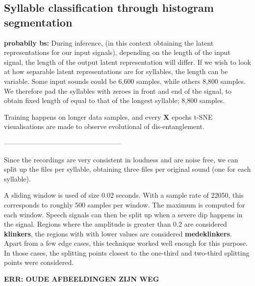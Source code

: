 \begin{appendices}
	\chapter{Syllable classification through histogram segmentation} \label{appendix:split_syllables}
	
	
	\textbf{probabily bs:}
	During inference, (in this context obtaining the latent representations for our input signals), depending on the length of the input signal, the length of the output latent representation will differ.
	If we wish to look at how separable latent representations are for syllables, the length can be variable. Some input sounds could be 6,600 samples, while others 8,800 samples. We therefore pad the syllables with zeroes in front and end of the signal, to obtain fixed length of equal to that of the longest syllable; 8,800 samples.
	
	Training happens on longer data samples, and every \textbf{X} epochs t-SNE visualisations are made to observe evolutional of dis-entanglement.
	
	
	
	
	
	---------------------------------------------------
	
	
	
	
	Since the recordings are very consistent in loudness and are noise free, we can split up the files per syllable, obtaining three files per original sound (one for each syllable).
	
	A sliding window is used of size 0.02 seconds. With a sample rate of 22050, this corresponds to roughly 500 samples per window. The maximum is computed for each window. Speech signals can then be split up when a severe dip happens in the signal. Regions where the amplitude is greater than 0.2 are considered \textbf{klinkers}, the regions with with lower values are considered \textbf{medeklinkers}. Apart from a few edge cases, this technique worked well enough for this purpose. In those cases, the splitting points closest to the one-third and two-third splitting points were considered.
	
	\textbf{ERR: OUDE AFBEELDINGEN ZIJN WEG}
	

\end{appendices}
